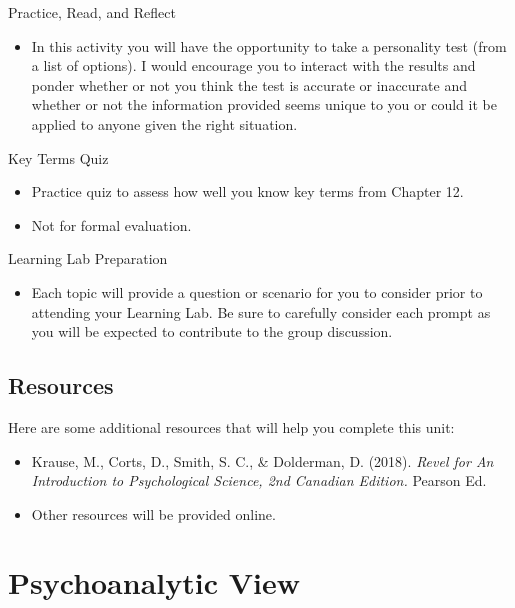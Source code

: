 \documentclass[
]{book}
\providecommand{\tightlist}{%
  \setlength{\itemsep}{0pt}\setlength{\parskip}{0pt}}
\begin{document}
\begin{reflect}
{Practice, Read, and Reflect}

\begin{itemize}
\tightlist
\item
  In this activity you will have the opportunity to take a personality test (from a list of options). I would encourage you to interact with the results and ponder whether or not you think the test is accurate or inaccurate and whether or not the information provided seems unique to you or could it be applied to anyone given the right situation.
\end{itemize}

{Key Terms Quiz}

\begin{itemize}
\tightlist
\item
  Practice quiz to assess how well you know key terms from Chapter 12.\\
\item
  Not for formal evaluation.
\end{itemize}

{Learning Lab Preparation}

\begin{itemize}
\tightlist
\item
  Each topic will provide a question or scenario for you to consider prior to attending your Learning Lab. Be sure to carefully consider each prompt as you will be expected to contribute to the group discussion.
\end{itemize}
\end{reflect}

\hypertarget{resources-6}{%
\subsection*{Resources}\label{resources-6}}

Here are some additional resources that will help you complete this unit:

\begin{itemize}
\tightlist
\item
  Krause, M., Corts, D., Smith, S. C., \& Dolderman, D. (2018). \emph{Revel for An Introduction to Psychological Science, 2nd Canadian Edition.} Pearson Ed.\\
\item
  Other resources will be provided online.
\end{itemize}

\hypertarget{psychoanalytic-view}{%
\section{Psychoanalytic View}\label{psychoanalytic-view}}
\end{document}
